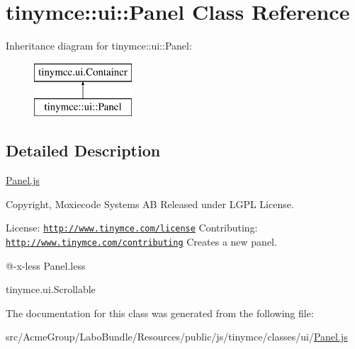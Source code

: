 \hypertarget{classtinymce_1_1ui_1_1_panel}{\section{tinymce\+:\+:ui\+:\+:Panel Class Reference}
\label{classtinymce_1_1ui_1_1_panel}
}
Inheritance diagram for tinymce\+:\+:ui\+:\+:Panel\+:\begin{figure}[H]
\begin{center}
\leavevmode
\includegraphics[height=2.000000cm]{classtinymce_1_1ui_1_1_panel}
\end{center}
\end{figure}


\subsection{Detailed Description}
\hyperlink{_panel_8js}{Panel.\+js}

Copyright, Moxiecode Systems A\+B Released under L\+G\+P\+L License.

License\+: \href{http://www.tinymce.com/license}{\tt http\+://www.\+tinymce.\+com/license} Contributing\+: \href{http://www.tinymce.com/contributing}{\tt http\+://www.\+tinymce.\+com/contributing} Creates a new panel.

@-\/x-\/less Panel.\+less

tinymce.\+ui.\+Scrollable 

The documentation for this class was generated from the following file\+:\begin{DoxyCompactItemize}
\item 
src/\+Acme\+Group/\+Labo\+Bundle/\+Resources/public/js/tinymce/classes/ui/\hyperlink{_panel_8js}{Panel.\+js}\end{DoxyCompactItemize}
